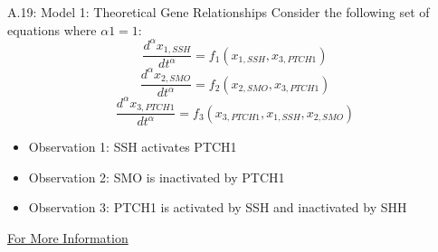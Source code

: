
\begin{alertblock}{A.19: Model 1: Theoretical Gene Relationships}
\vspace{8pt}
	Consider the following set of equations where $\alpha1=1$:
\begin{equation}
\frac{d^{\alpha}x_{1,SSH}}{dt^{\alpha}}=f_{1}(x_{1, SSH},x_{3,PTCH1})
\end{equation}
\begin{equation}
\frac{d^{\alpha}x_{2,SMO}}{dt^{\alpha}}=f_{2}(x_{2,SMO},x_{3, PTCH1})
\end{equation}
\begin{equation}
\frac{d^{\alpha}x_{3,PTCH1}}{dt^{\alpha}}=f_{3}(x_{3,PTCH1},x_{1,SSH},x_{2,SMO})
\end{equation}
\vspace{8pt}
\begin{itemize}
\item Observation 1: SSH activates PTCH1
\item Observation 2: SMO is inactivated by PTCH1 
\item Observation 3: PTCH1 is activated by SSH and inactivated by SHH
\end{itemize}
\href{http://mathlearningspace.weebly.com/}{For More Information}
\end{alertblock}